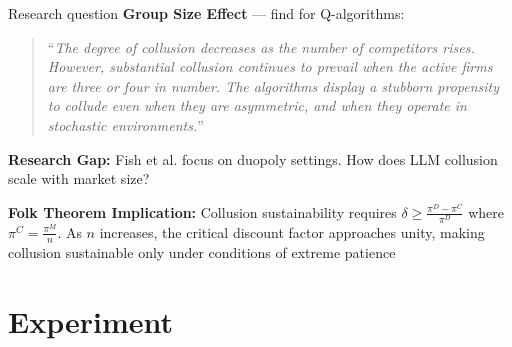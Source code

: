 \documentclass[10pt, aspectratio=169]{beamer}
\begin{document}
\begin{frame}{Research question}\label{app:researchquestion}
    \textbf{Group Size Effect} --- \textcite[p. 3268]{calvano_artificial_2020} find for Q-algorithms: 
    
    \vspace{0.5cm}
    \begin{quote}
        \enquote{\emph{The degree of collusion decreases as the number of competitors rises. However, substantial collusion continues to prevail when the active firms are three or four in number. The algorithms display a stubborn propensity to collude even when they are asymmetric, and when they operate in stochastic environments.}}
    \end{quote}
    \vfill
    \begin{center}
        \begin{tcolorbox}[colback=myblue!10, colframe=myblue, width=0.9\textwidth]
        \centering
        \textbf{Research Gap:} Fish et al. focus on duopoly settings. How does LLM collusion scale with market size?
        
        \vspace{0.5cm}
        
        \textbf{Folk Theorem Implication:} Collusion sustainability requires $\delta \geq \frac{\pi^D - \pi^C}{\pi^D}$ where $\pi^C = \frac{\pi^M}{n}$. As $n$ increases, the critical discount factor approaches unity, making collusion sustainable only under conditions of extreme patience \hyperlink{app:ft}{\hyperlink{app:ft}{}}
        \end{tcolorbox}
    \end{center}
\end{frame}


\section{Experiment}
\end{document}
